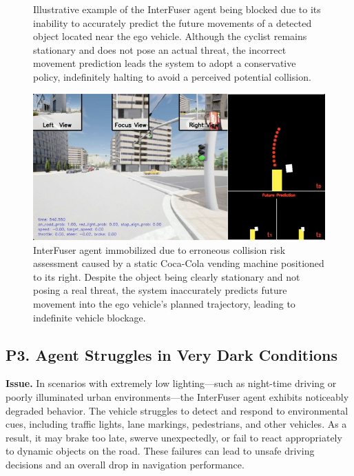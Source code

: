 \begin{figure}[htbp]
\begin{subfigure}[b]{0.45\textwidth}
        \label{fig:RS01_incorrect_bike_prediction}
    \end{subfigure}
    \caption{Illustrative example of the InterFuser agent being blocked due to its inability to accurately predict the future movements of a detected object located near the ego vehicle. Although the cyclist remains stationary and does not pose an actual threat, the incorrect movement prediction leads the system to adopt a conservative policy, indefinitely halting to avoid a perceived potential collision.}
    \label{fig:interfuser_prediction_issue}
\end{figure}

\begin{figure}[htbp]
    \centering
    \includegraphics[width=\linewidth]{images/new_int_RS25.png}
    \caption{InterFuser agent immobilized due to erroneous collision risk assessment caused by a static Coca-Cola vending machine positioned to its right. Despite the object being clearly stationary and not posing a real threat, the system inaccurately predicts future movement into the ego vehicle’s planned trajectory, leading to indefinite vehicle blockage.}
    \label{fig:RS25_static_object_blocking}
\end{figure}

\subsection{P3. Agent Struggles in Very Dark Conditions}
\noindent\textbf{Issue.} In scenarios with extremely low lighting—such as night-time driving or poorly illuminated urban environments—the InterFuser agent exhibits noticeably degraded behavior. The vehicle struggles to detect and respond to environmental cues, including traffic lights, lane markings, pedestrians, and other vehicles. As a result, it may brake too late, swerve unexpectedly, or fail to react appropriately to dynamic objects on the road. These failures can lead to unsafe driving decisions and an overall drop in navigation performance.


